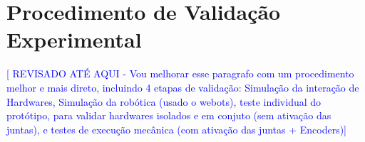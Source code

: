 \section{Procedimento de Validação Experimental}
\label{sec:validacao}
\textcolor{blue}{[ REVISADO ATÉ AQUI - Vou melhorar esse paragrafo com um procedimento melhor e mais direto, incluindo 4 etapas de validação: Simulação da interação de Hardwares, Simulação da robótica (usado o webots), teste individual do protótipo, para validar hardwares isolados e em conjuto (sem ativação das juntas), e testes de execução mecânica (com ativação das juntas + Encoders)]}
